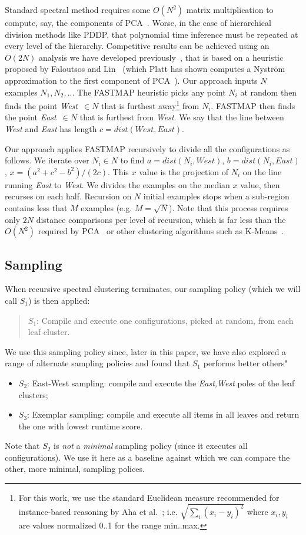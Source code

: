 \documentclass{sig-alternative}
\newcommand{\bi}{\begin{itemize}}%
\newcommand{\ei}{\end{itemize}}
\begin{document}
Standard spectral method requires some $O(N^2)$ matrix multiplication to compute, say, the components
of PCA~\cite{ilin10}. Worse, in the case of hierarchical division methods like PDDP,
that polynomial time inference must be repeated at every level of the hierarchy.
Competitive results can be achieved
using an $O(2N)$ analysis we have developed previously~\cite{me12d}, that is  based on  a heuristic proposed by
Faloutsos and Lin~\cite{Faloutsos1995}
(which
Platt has
  shown computes a Nystr\"om
  approximation to the first component of
  PCA~\cite{platt05}).
  Our approach inputs
$N$
examples $N_1,N_2,..$. The FASTMAP heuristic
picks any
point $N_i$ at random then  finds
 the point  {\em West}~$\in N$ that is
furthest away\footnote{
 For this work, we use the standard Euclidean measure recommended for
instance-based reasoning by Aha et al.~\cite{aha91};
i.e. $\sqrt{\sum_i(x_i-y_i)^2}$ where $x_i,y_i$
are values normalized 0..1 for the range min..max.}
from $N_i$.
FASTMAP then
finds the point {\em East}~$\in N$
that is furthest from {\em West}.
We say that the line between {\em West} and {\em East} has  length  
$c=\mathit{dist}(\mathit{West},\mathit{East})$.

Our approach applies FASTMAP recursively to divide all the configurations as follows.
We iterate over $N_i \in N$
to find
$a=\mathit{dist}(N_i,\mathit{West})$,
$b=\mathit{dist}(N_i,\mathit{East})$,
$x=(a^2 + c^2 - b^2)/(2c)$.
This  $x$ value is the projection of $N_i$
on the line  running  {\em East} to {\em West}.  We divides
the examples on the median $x$ value,
then recurses on each half. Recursion on
$N$ initial
examples stops when a sub-region
contains less that  $M$ examples (e.g. 
$M=\sqrt{N}$).
Note that this process requires only $2N$ distance comparisons
per level of recursion, which is far less than the $O(N^2)$
required by PCA~\cite{Du2008}
or other clustering algorithms such as K-Means~\cite{hamerly2010making}.

\subsection{Sampling}
When recursive spectral clustering terminates, our  sampling policy (which we will call $S_1$) is then applied:
\begin{quote}
$S_1$: Compile and execute one  configurations,  picked at random, from each leaf cluster.
\end{quote}
We use this sampling policy since, later in this paper, we have also explored a range of alternate sampling policies
and found that $S_1$ performs better others"
\bi
\item $S_2$: East-West sampling: compile and execute the {\em East,West} poles of the leaf clusters;
\item $S_3$: Exemplar sampling: compile and execute all items in all leaves and return the one
with lowest runtime score.
\ei
Note that $S_2$ is {\em not} a {\em minimal} sampling policy (since it executes all configurations). 
We use it here as a baseline
against which we can compare the other, more minimal, sampling polices.
\end{document}
